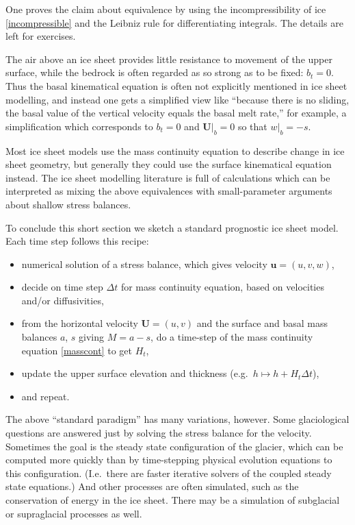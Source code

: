 \documentclass[titlepage,a4paper,final,12pt]{scrartcl}
\begin{document}
One proves the claim about equivalence by using the incompressibility of ice \eqref{incompressible} and the Leibniz rule for differentiating integrals.  The details are left for exercises.

The air above an ice sheet provides little resistance to movement of the upper surface, while the bedrock is often regarded as so strong as to be fixed: $b_t=0$.  Thus the basal kinematical equation is often not explicitly mentioned in ice sheet modelling, and instead one gets a simplified view like ``because there is no sliding, the basal value of the vertical velocity equals the basal melt rate,'' for example, a simplification which corresponds to $b_t=0$ and $\mathbf{U}\big|_b=0$ so that $w\big|_b=-s$.

Most ice sheet models use the mass continuity equation to describe change in ice sheet geometry, but generally they could use the surface kinematical equation instead.  The ice sheet modelling literature is full of calculations which can be interpreted as mixing the above equivalences with small-parameter arguments about shallow stress balances.

To conclude this short section we sketch a standard prognostic ice sheet model.  Each time step follows this recipe:
  \begin{itemize}
  \item numerical solution of a stress balance, which gives velocity $\mathbf{u}=(u,v,w)$,
  \item decide on time step $\Delta t$ for mass continuity equation, based on velocities and/or diffusivities,
  \item from the horizontal velocity $\mathbf{U}=(u,v)$ and the surface and basal mass balances $a$, $s$ giving $M=a-s$, do a time-step of the mass continuity equation \eqref{masscont} to get $H_t$,
  \item update the upper surface elevation and thickness (e.g.~$h \mapsto h + H_t \Delta t$),
  \item and repeat.
  \end{itemize}

The above ``standard paradigm'' has many variations, however.  Some glaciological questions are answered just by solving the stress balance for the velocity.  Sometimes the goal is the steady state configuration of the glacier, which can be computed more quickly than by time-stepping physical evolution equations to this configuration.  (I.e.~there are faster iterative solvers of the coupled steady state equations.)  And other processes are often simulated, such as the conservation of energy in the ice sheet.  There may be a simulation of subglacial or supraglacial processes as well.
\end{document}
